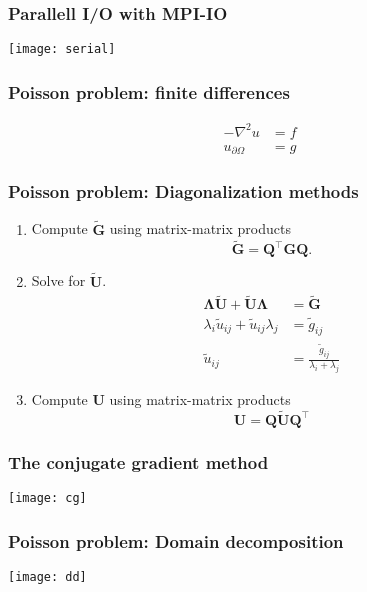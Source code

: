 \begin{frame}
  \frametitle{Parallell I/O with MPI-IO}
  \begin{center}
    \texttt{[image: serial]}
  \end{center}
\end{frame}

\begin{frame}
  \frametitle{Poisson problem: finite differences}
  \[
    \begin{split}
      -\nabla^2 u &= f \\
      u_{\partial\Omega} &= g
    \end{split}
  \]
  \begin{center}
    \scalebox{0.8}{
      
    }
  \end{center}
\end{frame}

\begin{frame}
  \frametitle{Poisson problem: Diagonalization methods}
  \begin{enumerate}
  \item Compute $\tilde{\bm G}$ using matrix-matrix products
    \begin{equation*}
      \tilde{\bm G} = \bm Q^\intercal \bm G \bm Q.
    \end{equation*}
  \item Solve for $\tilde{\bm U}$.
    \begin{align*}
      \bm \Lambda \tilde{\bm U} + \tilde{\bm U} \bm \Lambda &= \tilde{\bm G} \\
      \lambda_i \tilde{u}_{ij} + \tilde{u}_{ij} \lambda_j &= \tilde{g}_{ij} \\
      \tilde{u}_{ij} &= \frac{\tilde{g}_{ij}}{\lambda_i + \lambda_j}
    \end{align*}
  \item Compute $\bm U$ using matrix-matrix products
    \begin{equation*}
      \bm U = \bm Q \tilde{\bm U} \bm Q^\intercal
    \end{equation*}
  \end{enumerate}
\end{frame}

\begin{frame}
  \frametitle{The conjugate gradient method}
  \begin{center}
    \texttt{[image: cg]}
  \end{center}
\end{frame}

\begin{frame}
  \frametitle{Poisson problem: Domain decomposition}
  \begin{center}
    \texttt{[image: dd]}
  \end{center}
\end{frame}



